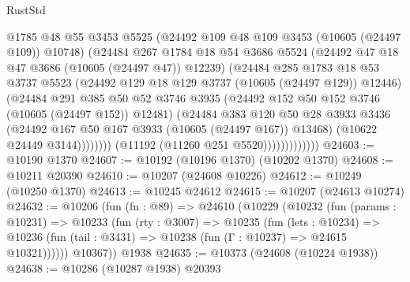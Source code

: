 \begin{lexlean}{RustStd}
\begin{coremodule}
                                @1785
                                @48
                                @55
                                @3453
                                @5525
                                (@24492 @109 @48 @109 @3453 (@10605 (@24497 @109)) @10748)
                                (@24484
                                  @267
                                  @1784
                                  @18
                                  @54
                                  @3686
                                  @5524
                                  (@24492 @47 @18 @47 @3686 (@10605 (@24497 @47)) @12239)
                                  (@24484
                                    @285
                                    @1783
                                    @18
                                    @53
                                    @3737
                                    @5523
                                    (@24492 @129 @18 @129 @3737 (@10605 (@24497 @129)) @12446)
                                    (@24484
                                      @291
                                      @385
                                      @50
                                      @52
                                      @3746
                                      @3935
                                      (@24492 @152 @50 @152 @3746 (@10605 (@24497 @152)) @12481)
                                      (@24484
                                        @383
                                        @120
                                        @50
                                        @28
                                        @3933
                                        @3436
                                        (@24492 @167 @50 @167 @3933 (@10605 (@24497 @167)) @13468)
                                        (@10622 @24449 @3144))))))))
                          (@11192 (@11260 @251 @5520)))))))))))))
@24603 := @10190 @1370
@24607 := @10192 (@10196 @1370) (@10202 @1370)
@24608 := @10211 @20390
@24610 := @10207 (@24608 @10226)
@24612 := @10249 (@10250 @1370)
@24613 := @10245 @24612
@24615 := @10207 (@24613 @10274)
@24632 := @10206
    (fun (fn : @89) =>
    @24610
      (@10229
        (@10232
          (fun (params : @10231) =>
          @10233
            (fun (rty : @3007) =>
            @10235
              (fun (lets : @10234) =>
              @10236 (fun (tail : @3431) => @10238 (fun (Γ : @10237) => @24615 @10321))))))
        @10367))
    @1938
@24635 := @10373 (@24608 (@10224 @1938))
@24638 := @10286 (@10287 @1938) @20393

\end{coremodule}
\end{lexlean}
